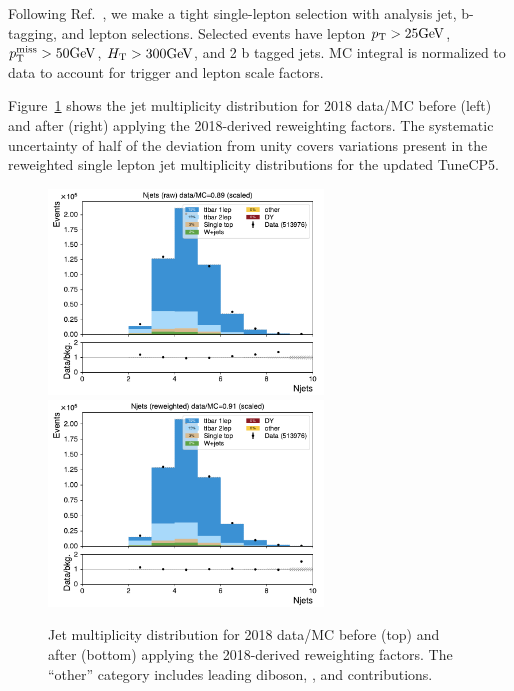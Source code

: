 Following Ref.~\cite{CMS:isrweight}, 
we make a tight single-lepton selection with analysis jet, b-tagging, and lepton selections.
Selected events have lepton $p_{\mathrm{T}}>25\text{GeV}$, $p_{\mathrm{T}}^\text{miss}>50\text{GeV}$, $H_{\mathrm{T}}>300\text{GeV}$, and 2 b tagged jets. MC integral is normalized to
data to account for trigger and lepton scale factors.

Figure~\ref{fig:isrweightsyst} shows the jet multiplicity distribution for 2018 data/MC before (left) and after (right)
applying the 2018-derived reweighting factors. The systematic uncertainty of half of the deviation from unity covers
variations present in the reweighted single lepton jet multiplicity distributions for the updated TuneCP5.

\begin{figure}[h!]
\centering
\includegraphics[width=0.65\textwidth]{figs/ftan/isr/njets_raw.pdf} \\
\includegraphics[width=0.65\textwidth]{figs/ftan/isr/njets_corr.pdf}
\caption{
    Jet multiplicity distribution for 2018 data/MC before (top) and after (bottom)
    applying the 2018-derived reweighting factors. The ``other'' category includes
    leading diboson, \ttW, and \ttZ contributions.
}
\label{fig:isrweightsyst}
\end{figure}


